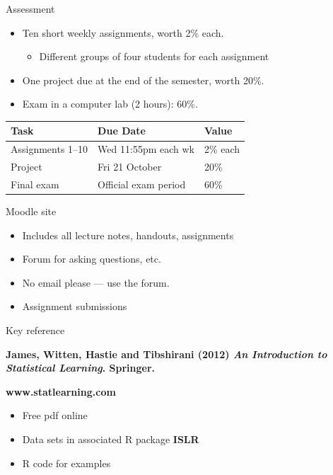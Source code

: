 \documentclass[14pt]{beamer}
\begin{document}
\begin{frame}{Assessment}

\begin{itemize}
\item Ten short weekly assignments, worth 2\% each.
\begin{itemize}
\item Different groups of four students for each assignment
\end{itemize}
\item One project due at the end of the semester, worth 20\%.
\item Exam in a computer lab (2 hours): 60\%.
\end{itemize}

\begin{block}{}{\tabcolsep=0.1cm\begin{tabular}{lll}
  \textbf{Task}     & \textbf{Due Date}     & \textbf{Value} \\ \midrule
  Assignments 1--10 & Wed 11:55pm each wk & 2\% each\\
  Project           & Fri 21 October        & 20\%           \\
  Final exam        & Official exam period  & 60\%          
\end{tabular}}
\end{block}

\end{frame}


\begin{frame}{Moodle site}

\begin{itemize}
\item Includes all lecture notes, handouts, assignments
\item Forum for asking questions, etc.
\item No email please --- use the forum.
\item Assignment submissions
\end{itemize}

\end{frame}

\begin{frame}{Key reference}\large

\begin{block}{}\bf
{James, Witten, Hastie and Tibshirani (2012) \emph{An Introduction to Statistical Learning}. Springer.}
\end{block}
\begin{alertblock}{}\Large
\centerline{\bf www.statlearning.com}
\end{alertblock}

\begin{itemize}
\item Free pdf online
\item Data sets in associated R package \textbf{ISLR}
\item R code for examples
\end{itemize}
\end{frame}
\end{document}
